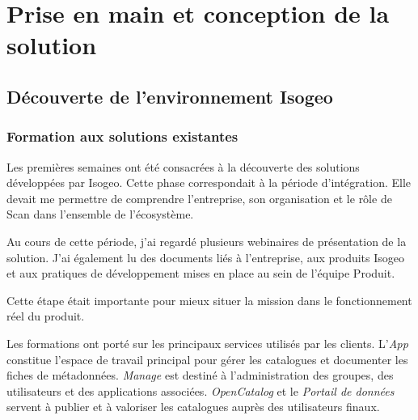 
\chapter{Prise en main et conception de la solution}
\label{chap:prise_en_main_conception}


\section{Découverte de l'environnement Isogeo}
\label{sec:decouverte_environnement_isogeo}


\subsection{Formation aux solutions existantes}
\label{subsec:formation_solutions_existantes}

Les premières semaines ont été consacrées à la découverte des solutions
développées par Isogeo. Cette phase correspondait à la période d'intégration.
Elle devait me permettre de comprendre l'entreprise, son organisation et le
rôle de Scan dans l'ensemble de l'écosystème.

Au cours de cette période, j'ai regardé plusieurs webinaires de présentation de
la solution. J'ai également lu des documents liés à l'entreprise, aux produits
Isogeo et aux pratiques de développement mises en place au sein de l'équipe
Produit.

Cette étape était importante pour mieux situer la mission dans le fonctionnement
réel du produit.

Les formations ont porté sur les principaux services utilisés par les clients.
L'\textit{App} constitue l'espace de travail principal pour gérer les catalogues
et documenter les fiches de métadonnées. \textit{Manage} est destiné à
l'administration des groupes, des utilisateurs et des applications associées.
\textit{OpenCatalog} et le \textit{Portail de données} servent à publier et à
valoriser les catalogues auprès des utilisateurs finaux.

